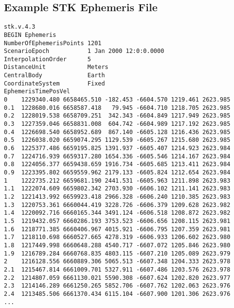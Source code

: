 \subsection{Example STK Ephemeris File}\label{app:efile}
\begin{verbatim}
stk.v.4.3
BEGIN Ephemeris
NumberOfEphemerisPoints 1201
ScenarioEpoch           1 Jan 2000 12:0:0.0000
InterpolationOrder      5
DistanceUnit            Meters
CentralBody             Earth
CoordinateSystem        Fixed
EphemerisTimePosVel
0    1229340.480 6658465.510 -182.453 -6604.570 1219.461 2623.985
0.1  1228680.016 6658587.418   79.945 -6604.710 1218.705 2623.985
0.2  1228019.538 6658709.251  342.343 -6604.849 1217.949 2623.985
0.3  1227359.046 6658831.008  604.742 -6604.989 1217.192 2623.985
0.4  1226698.540 6658952.689  867.140 -6605.128 1216.436 2623.985
0.5  1226038.020 6659074.295 1129.539 -6605.267 1215.680 2623.985
0.6  1225377.486 6659195.825 1391.937 -6605.407 1214.923 2623.984
0.7  1224716.939 6659317.280 1654.336 -6605.546 1214.167 2623.984
0.8  1224056.377 6659438.659 1916.734 -6605.685 1213.411 2623.984
0.9  1223395.802 6659559.962 2179.133 -6605.824 1212.654 2623.984
1    1222735.212 6659681.190 2441.531 -6605.963 1211.898 2623.983
1.1  1222074.609 6659802.342 2703.930 -6606.102 1211.141 2623.983
1.2  1221413.992 6659923.418 2966.328 -6606.240 1210.385 2623.983
1.3  1220753.361 6660044.419 3228.726 -6606.379 1209.628 2623.982
1.4  1220092.716 6660165.344 3491.124 -6606.518 1208.872 2623.982
1.5  1219432.057 6660286.193 3753.523 -6606.656 1208.115 2623.981
1.6  1218771.385 6660406.967 4015.921 -6606.795 1207.359 2623.981
1.7  1218110.698 6660527.665 4278.319 -6606.933 1206.602 2623.980
1.8  1217449.998 6660648.288 4540.717 -6607.072 1205.846 2623.980
1.9  1216789.284 6660768.835 4803.115 -6607.210 1205.089 2623.979
2    1216128.556 6660889.306 5065.513 -6607.348 1204.333 2623.978
2.1  1215467.814 6661009.701 5327.911 -6607.486 1203.576 2623.978
2.2  1214807.059 6661130.021 5590.308 -6607.624 1202.820 2623.977
2.3  1214146.289 6661250.265 5852.706 -6607.762 1202.063 2623.976
2.4  1213485.506 6661370.434 6115.104 -6607.900 1201.306 2623.976
...
\end{verbatim}

